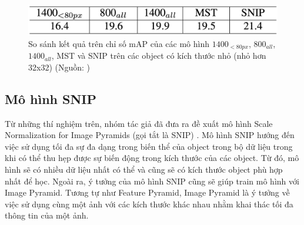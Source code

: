 {    \begin{figure}[H]
        \centering
        \includegraphics[width=13cm] {images/snip_result_compare}
        \caption{So sánh kết quả trên chỉ số mAP của các mô hình ${1400}_{<80px}$, ${800}_{all}$, ${1400}_{all}$, MST và SNIP trên các object có kích thước nhỏ (nhỏ hơn 32x32) (Nguồn: \cite{singh2018analysis})}
        \label{fig:snip_result_compare}
    \end{figure}

    \subsection{Mô hình SNIP}
    Từ những thí nghiệm trên, nhóm tác giả đã đưa ra đề xuất mô hình Scale Normalization for Image Pyramids (gọi tắt là SNIP) \cite{singh2018analysis}.
    Mô hình SNIP hướng đến việc sử dụng tối đa sự đa dạng trong biến thể của object trong bộ dữ liệu trong khi có thể thu hẹp được sự biến động trong kích thước của các object.
    Từ đó, mô hình sẽ có nhiều dữ liệu nhất có thể và cũng sẽ có kích thước object phù hợp nhất để học.
    Ngoài ra, ý tưởng của mô hình SNIP cũng sẽ giúp train mô hình với Image Pyramid.
    Tương tự như Feature Pyramid, Image Pyramid là ý tưởng về việc sử dụng cùng một ảnh với các kích thước khác nhau nhằm khai thác tối đa thông tin của một ảnh.

}
